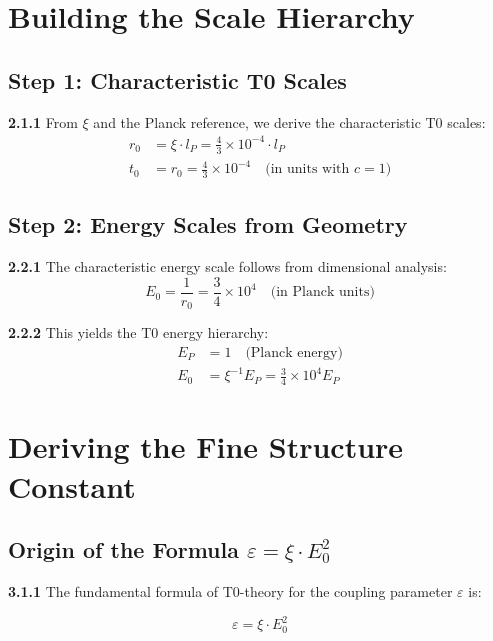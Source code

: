 \documentclass[12pt,a4paper]{article}
\newcommand{\lP}{l_P}
\newcommand{\EP}{E_P}
\newcommand{\rzero}{r_0}
\newcommand{\tzero}{t_0}
\newcommand{\Ezero}{E_0}
\newcommand{\xipar}{\xi}
\begin{document}
	\section{Building the Scale Hierarchy}
	
	\subsection{Step 1: Characteristic T0 Scales}
	
	\noindent \textbf{2.1.1} From $\xipar$ and the Planck reference, we derive the characteristic T0 scales:
	\begin{align}
		\rzero &= \xipar \cdot \lP = \frac{4}{3} \times 10^{-4} \cdot \lP \\
		\tzero &= \rzero = \frac{4}{3} \times 10^{-4} \quad \text{(in units with } c=1\text{)}
	\end{align}
	
	\subsection{Step 2: Energy Scales from Geometry}
	
	\noindent \textbf{2.2.1} The characteristic energy scale follows from dimensional analysis:
	\begin{equation}
		\Ezero = \frac{1}{\rzero} = \frac{3}{4} \times 10^{4} \quad \text{(in Planck units)}
	\end{equation}
	
	\noindent \textbf{2.2.2} This yields the T0 energy hierarchy:
	\begin{align}
		\EP &= 1 \quad \text{(Planck energy)} \\
		\Ezero &= \xipar^{-1} \EP = \frac{3}{4} \times 10^{4} \EP
	\end{align}
	
	\section{Deriving the Fine Structure Constant}
	
	\subsection{Origin of the Formula $\varepsilon = \xipar \cdot \Ezero^2$}
	
	\noindent \textbf{3.1.1} The fundamental formula of T0-theory for the coupling parameter $\varepsilon$ is:
	\begin{keyresult}
		\begin{equation}
			\boxed{\varepsilon = \xipar \cdot \Ezero^2}
			\label{eq:epsilon_definition}
		\end{equation}
	\end{keyresult}
	
\end{document}
